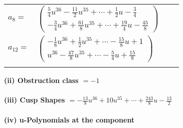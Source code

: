 \documentclass[1p]{elsarticle_modified}
\theoremstyle{definition}
\begin{document}
\begin{tabular}{m{7pt} m{180pt} m{7pt} m{180pt} }
\flushright $a_{8}=$&$\begin{pmatrix}\frac{5}{4} u^{36}-\frac{11}{2} u^{35}+\cdots+\frac{1}{2} u-\frac{3}{4}\\-\frac{3}{4} u^{36}+\frac{61}{8} u^{35}+\cdots+\frac{19}{4} u-\frac{45}{8}\end{pmatrix}$ \\
\flushright $a_{12}=$&$\begin{pmatrix}-\frac{1}{8} u^{36}+\frac{1}{2} u^{35}+\cdots-\frac{15}{8} u+1\\u^{36}-\frac{47}{8} u^{35}+\cdots-\frac{5}{4} u+\frac{15}{8}\end{pmatrix}$\\&\end{tabular}
\flushleft \textbf{(ii) Obstruction class $= -1$}\\~\\
\flushleft \textbf{(iii) Cusp Shapes $= -\frac{13}{8} u^{36}+10 u^{35}+\cdots+\frac{243}{8} u-\frac{13}{2}$}\\~\\
\newpage\renewcommand{\arraystretch}{1}
\flushleft \textbf{(iv) u-Polynomials at the component}\newline \\
\end{document}
